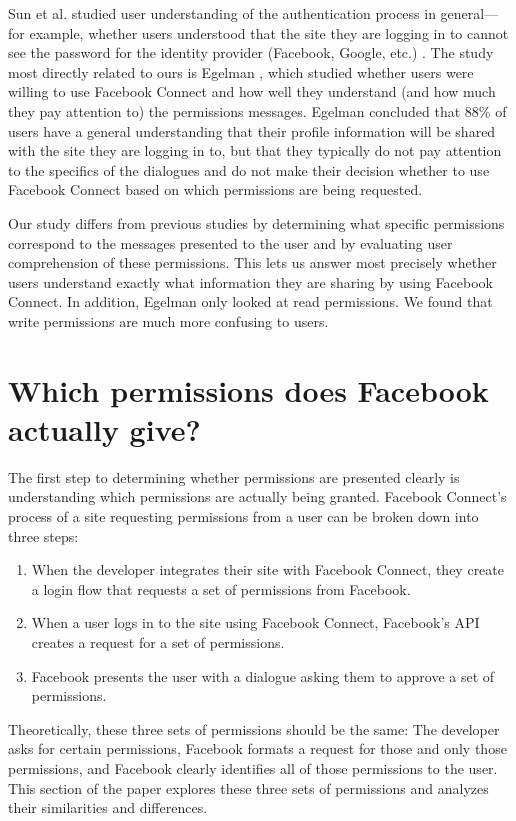 \documentclass[10pt]{sig-alternate-10pt}
\begin{document}
Sun et al. studied user understanding of the authentication process in general---for example, whether users understood that the site they are logging in to cannot see the password for the identity provider (Facebook, Google, etc.) \cite{ssoperspective}. The study most directly related to ours is Egelman \cite{egelman}, which studied whether users were willing to use Facebook Connect and how well they understand (and how much they pay attention to) the permissions messages. Egelman concluded that 88\% of users have a general understanding that their profile information will be shared with the site they are logging in to, but that they typically do not pay attention to the specifics of the dialogues and do not make their decision whether to use Facebook Connect based on which permissions are being requested.

Our study differs from previous studies by determining what specific permissions correspond to the messages presented to the user and by evaluating user comprehension of these permissions. This lets us answer most precisely whether users understand exactly what information they are sharing by using Facebook Connect. In addition, Egelman only looked at read permissions. We found that write permissions are much more confusing to users.


\section{Which permissions does Facebook actually give?}

The first step to determining whether permissions are presented clearly is understanding which permissions are actually being granted. Facebook Connect's process of a site requesting permissions from a user can be broken down into three steps:

\begin{enumerate}
  \item When the developer integrates their site with Facebook Connect, they create a login flow that requests a set of permissions from Facebook.
  \item When a user logs in to the site using Facebook Connect, Facebook's API creates a request for a set of permissions.
  \item Facebook presents the user with a dialogue asking them to approve a set of permissions.
\end{enumerate}

Theoretically, these three sets of permissions should be the same: The developer asks for certain permissions, Facebook formats a request for those and only those permissions, and Facebook clearly identifies all of those permissions to the user. This section of the paper explores these three sets of permissions and analyzes their similarities and differences.
\end{document}
